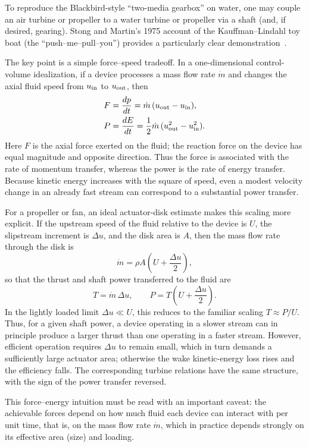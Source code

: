 \documentclass[a4paper]{article}
\begin{document}
To reproduce the Blackbird-style ``two-media gearbox'' on water, one may couple
an air turbine or propeller to a water turbine or propeller via a shaft (and,
if desired, gearing).  Stong and Martin's 1975 account of the Kauffman--Lindahl toy boat
(the ``push--me--pull--you'') provides a particularly clear
demonstration~\cite{Stong1975}.

The key point is a simple force--speed tradeoff. In a one-dimensional
control-volume idealization, if a device processes a mass flow rate \(\dot m\)
and changes the axial fluid speed from \(u_{\rm in}\) to \(u_{\rm out}\), then
\begin{align}
F &= \frac{dp}{dt}
   = \dot m \,(u_{\rm out}-u_{\rm in}), \\
P &= \frac{dE}{dt}
   = \frac{1}{2}\dot m \,(u_{\rm out}^2-u_{\rm in}^2).
\end{align}
Here \(F\) is the axial force exerted on the fluid; the reaction force on the
device has equal magnitude and opposite direction. Thus the force is associated
with the rate of momentum transfer, whereas the power is the rate of energy
transfer. Because kinetic energy increases with the square of speed, even a
modest velocity change in an already fast stream can correspond to a substantial
power transfer.

For a propeller or fan, an ideal actuator-disk estimate makes this scaling more
explicit. If the upstream speed of the fluid relative to the device is \(U\),
the slipstream increment is \(\Delta u\), and the disk area is \(A\), then the
mass flow rate through the disk is
\[
\dot m = \rho A\!\left(U+\frac{\Delta u}{2}\right),
\]
so that the thrust and shaft power transferred to the fluid are
\[
T = \dot m\,\Delta u,
\qquad
P = T\!\left(U+\frac{\Delta u}{2}\right).
\]
In the lightly loaded limit \(\Delta u \ll U\), this reduces to the familiar
scaling
\(
T \approx  {P}/{U}
\).
Thus, for a given shaft power, a device operating in a slower stream can in
principle produce a larger thrust than one operating in a faster stream.
However, efficient operation requires \(\Delta u\) to remain small, which in
turn demands a sufficiently large actuator area; otherwise the wake
kinetic-energy loss rises and the efficiency falls. The corresponding turbine
relations have the same structure, with the sign of the power transfer reversed.

This force--energy intuition must be read
with an important caveat: the achievable forces depend on how much fluid each
device can interact with per unit time, that is, on the mass flow rate
\(\dot m\), which in practice depends strongly on
its effective area (size) and loading.
\end{document}
